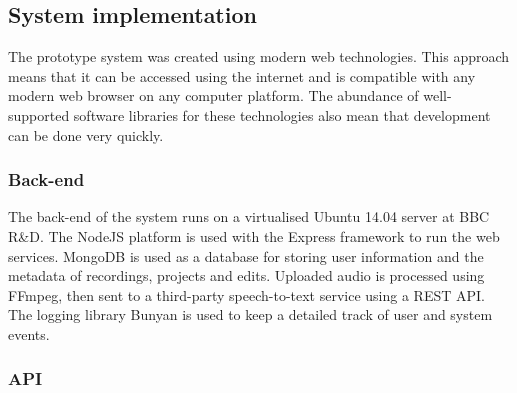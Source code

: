 \subsection{System implementation}
The prototype system was created using modern web technologies. This approach
means that it can be accessed using the internet and is compatible with any
modern web browser on any computer platform. The abundance of well-supported
software libraries for these technologies also mean that development can be
done very quickly.

\subsubsection{Back-end}
The back-end of the system runs on a virtualised Ubuntu 14.04 server at BBC
R\&D. The NodeJS platform is used with the Express framework to run the web
services. MongoDB is used as a database for storing user information and the
metadata of recordings, projects and edits. Uploaded audio is processed using
FFmpeg, then sent to a third-party speech-to-text service using a REST API. The
logging library Bunyan is used to keep a detailed track of user and system
events.

\subsubsection{API}\label{sec:api}

